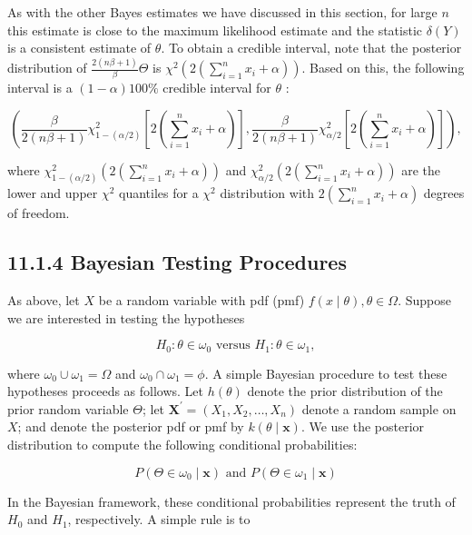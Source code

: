 As with the other Bayes estimates we have discussed in this section, for large $n$ this estimate is close to the maximum likelihood estimate and the statistic $\delta(Y)$ is a consistent estimate of $\theta$. To obtain a credible interval, note that the posterior distribution of $\frac{2(n \beta+1)}{\beta} \Theta$ is $\chi^{2}\left(2\left(\sum_{i=1}^{n} x_{i}+\alpha\right)\right)$. Based on this, the following interval is a $(1-\alpha) 100 \%$ credible interval for $\theta$ :


\begin{equation*}
\left(\frac{\beta}{2(n \beta+1)} \chi_{1-(\alpha / 2)}^{2}\left[2\left(\sum_{i=1}^{n} x_{i}+\alpha\right)\right], \frac{\beta}{2(n \beta+1)} \chi_{\alpha / 2}^{2}\left[2\left(\sum_{i=1}^{n} x_{i}+\alpha\right)\right]\right), \tag{11.1.12}
\end{equation*}


where $\chi_{1-(\alpha / 2)}^{2}\left(2\left(\sum_{i=1}^{n} x_{i}+\alpha\right)\right)$ and $\chi_{\alpha / 2}^{2}\left(2\left(\sum_{i=1}^{n} x_{i}+\alpha\right)\right)$ are the lower and upper $\chi^{2}$ quantiles for a $\chi^{2}$ distribution with $2\left(\sum_{i=1}^{n} x_{i}+\alpha\right)$ degrees of freedom.

\subsection*{11.1.4 Bayesian Testing Procedures}
As above, let $X$ be a random variable with pdf (pmf) $f(x \mid \theta), \theta \in \Omega$. Suppose we are interested in testing the hypotheses

$$
H_{0}: \theta \in \omega_{0} \text { versus } H_{1}: \theta \in \omega_{1},
$$

where $\omega_{0} \cup \omega_{1}=\Omega$ and $\omega_{0} \cap \omega_{1}=\phi$. A simple Bayesian procedure to test these hypotheses proceeds as follows. Let $h(\theta)$ denote the prior distribution of the prior random variable $\Theta$; let $\mathbf{X}^{\prime}=\left(X_{1}, X_{2}, \ldots, X_{n}\right)$ denote a random sample on $X$; and denote the posterior pdf or pmf by $k(\theta \mid \mathbf{x})$. We use the posterior distribution to compute the following conditional probabilities:

$$
P\left(\Theta \in \omega_{0} \mid \mathbf{x}\right) \text { and } P\left(\Theta \in \omega_{1} \mid \mathbf{x}\right)
$$

In the Bayesian framework, these conditional probabilities represent the truth of $H_{0}$ and $H_{1}$, respectively. A simple rule is to


